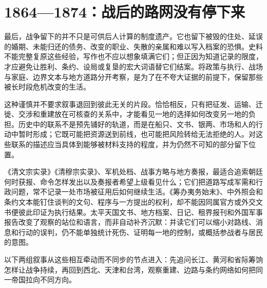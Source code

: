 \section{1864—1874：战后的路网没有停下来}

最后，战争留下的并不只是可供后人计算的制度遗产。它也留下被毁的住处、延误的婚期、未能归还的债务、改变的职业、失散的亲属和难以写入档案的恐惧。史料不能完整复原这些经验，写作也不应以想象填满它们；但正因为知道记录的限度，才应避免让胜利、条约、设局或复垦的宏大词语替它们结案。将政策与执行、战场与家庭、边界文本与地方道路分开考察，是为了在不夸大证据的前提下，保留那些被长时段危机改变的生活。

\noindent 这种谨慎并不要求叙事退回到彼此无关的片段。恰恰相反，只有把征发、运输、迁徙、交涉和重建放在可核查的关系中，才能看见一地的选择如何改变另一地的负担。历史中的联系不是预先铺好的轨道，而是在船只、文书、银两、市场和人的行动中暂时形成；它既可能把资源送到前线，也可能把风险转给无法拒绝的人。对这些联系的描述应当具体到能够被材料支持的程度，并为仍然不可知的部分留下位置。
\begin{sourcenote}[同一场危机为何会留下彼此不相同的地图]
《清文宗实录》《清穆宗实录》、军机处档、战事方略与地方奏报，最适合追索朝廷何时获报、命令怎样发出以及奏报者希望上级看见什么；它们把道路写成军需和行政问题，常不记录一处市场被征用后如何继续生活。《筹办夷务始末》、中外照会和条约文本能钉住谈判的文句、程序与一方提出的权利，却不能因同属官方或外交文书便彼此印证为执行结果。太平天国文书、地方档案、日记、租界报刊和外国军事报告改变了观察的站位和语言，而非自动补齐沉默：并读它们可以缩小对路线、消息和行动的误判，仍不能单独统计死伤、证明每一地的控制，或概括参战者与居民的意图。
\end{sourcenote}

\noindent 以下两组叙事从这些相互牵动而不同步的节点进入：先追问长江、黄河和省际筹饷怎样让战争持续，再回到西北、天津和台湾，观察重建、边路与条约网络如何把同一帝国拉向不同方向。



